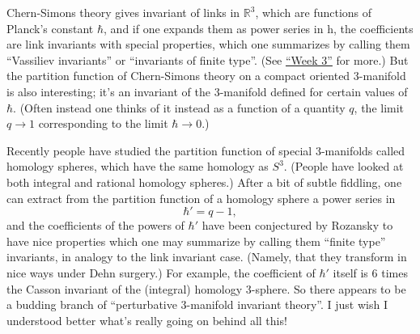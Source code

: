 \documentclass{article}
\renewcommand{\texttt}[1]{%
  \begingroup
  \ttfamily
  \begingroup\lccode`~=`/\lowercase{\endgroup\def~}{/\discretionary{}{}{}}%
  \begingroup\lccode`~=`[\lowercase{\endgroup\def~}{[\discretionary{}{}{}}%
  \begingroup\lccode`~=`.\lowercase{\endgroup\def~}{.\discretionary{}{}{}}%
  \catcode`/=\active\catcode`[=\active\catcode`.=\active
  \scantokens{#1\noexpand}%
  \endgroup
}
\begin{document}

Chern-Simons theory gives invariant of links in \(\mathbb{R}^3\), which
are functions of Planck's constant \(\hbar\), and if one expands them as
power series in h, the coefficients are link invariants with special
properties, which one summarizes by calling them ``Vassiliev
invariants'' or ``invariants of finite type''. (See
\protect\hyperlink{week3}{``Week 3''} for more.) But the partition
function of Chern-Simons theory on a compact oriented 3-manifold is also
interesting; it's an invariant of the 3-manifold defined for certain
values of \(\hbar\). (Often instead one thinks of it instead as a
function of a quantity \(q\), the limit \(q \to 1\) corresponding to the
limit \(\hbar \to 0\).)

Recently people have studied the partition function of special
3-manifolds called homology spheres, which have the same homology as
\(S^3\). (People have looked at both integral and rational homology
spheres.) After a bit of subtle fiddling, one can extract from the
partition function of a homology sphere a power series in
\[\hbar' = q - 1,\] and the coefficients of the powers of \(\hbar'\)
have been conjectured by Rozansky to have nice properties which one may
summarize by calling them ``finite type'' invariants, in analogy to the
link invariant case. (Namely, that they transform in nice ways under
Dehn surgery.) For example, the coefficient of \(\hbar'\) itself is 6
times the Casson invariant of the (integral) homology 3-sphere. So there
appears to be a budding branch of ``perturbative 3-manifold invariant
theory''. I just wish I understood better what's really going on behind
all this!
\end{document}

